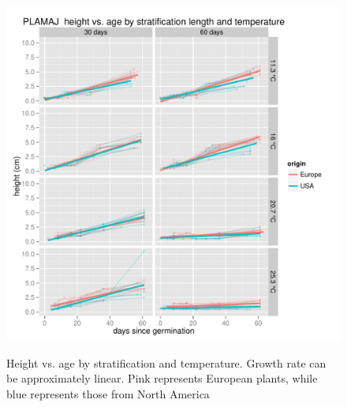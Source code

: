 \documentclass[12pt]{article}\usepackage[]{graphicx}\usepackage[]{color}
\begin{document}
\begin{figure}[H]
  {\includegraphics[scale=.5, page=5, trim=0cm 0cm 0cm 1.2cm, clip=TRUE]{supplement.pdf}}
  \caption{Height vs. age by stratification and temperature. Growth rate can be approximately linear.  Pink represents European   plants, while blue represents those from  North America \label{fig:lmgr}}
\end{figure}
\end{document}
